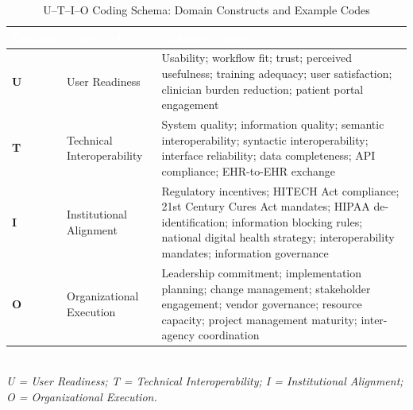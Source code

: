 
\begin{table}[H]
\caption{U--T--I--O Coding Schema: Domain Constructs and Example Codes}
\label{tab:coding-schema}
\centering
\small
\renewcommand{\arraystretch}{1.4}
\setlength{\tabcolsep}{8pt}
\begin{tabular}{>{\bfseries}p{1.5cm} p{3.2cm} p{8.5cm}}
\toprule
\rowcolor{headerblue}
\textcolor{white}{\textbf{Domain}} &
\textcolor{white}{\textbf{Construct}} &
\textcolor{white}{\textbf{Example Codes}} \\
\midrule

\rowcolor{rowgray}
U &
User Readiness &
Usability; workflow fit; trust; perceived usefulness; training adequacy; user satisfaction; clinician burden reduction; patient portal engagement \\

T &
Technical Interoperability &
System quality; information quality; semantic interoperability; syntactic interoperability; interface reliability; data completeness; API compliance; EHR-to-EHR exchange \\

\rowcolor{rowgray}
I &
Institutional Alignment &
Regulatory incentives; HITECH Act compliance; 21st Century Cures Act mandates; HIPAA de-identification; information blocking rules; national digital health strategy; interoperability mandates; information governance \\

O &
Organizational Execution &
Leadership commitment; implementation planning; change management; stakeholder engagement; vendor governance; resource capacity; project management maturity; inter-agency coordination \\

\bottomrule
\end{tabular}
\vspace{4pt}\\
{\footnotesize \textit{U = User Readiness; T = Technical Interoperability; I = Institutional Alignment; O = Organizational Execution.}}
\end{table}
